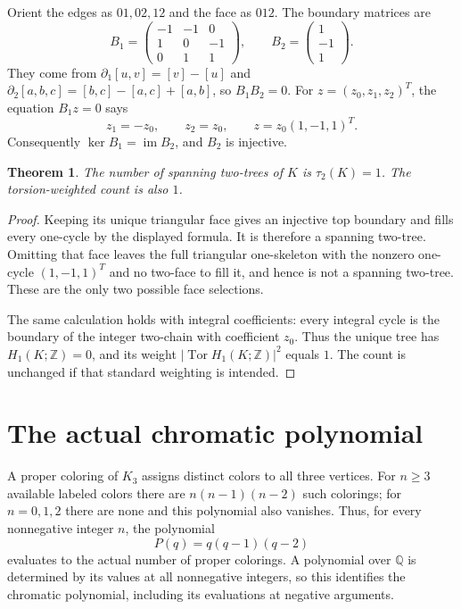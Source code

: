 \documentclass[11pt]{article}
\newtheorem{theorem}{Theorem}
\newcommand{\Q}{\mathbb Q}
\newcommand{\Z}{\mathbb Z}
\begin{document}
Orient the edges as $01,02,12$ and the face as $012$. The boundary matrices
are
\[
B_1=\begin{pmatrix}-1&-1&0\\1&0&-1\\0&1&1\end{pmatrix},
\qquad
B_2=\begin{pmatrix}1\\-1\\1\end{pmatrix}.
\]
They come from $\partial_1[u,v]=[v]-[u]$ and
$\partial_2[a,b,c]=[b,c]-[a,c]+[a,b]$, so $B_1B_2=0$.
For $z=(z_0,z_1,z_2)^T$, the equation $B_1z=0$ says
\[
z_1=-z_0,\qquad z_2=z_0,
\qquad z=z_0(1,-1,1)^T.
\]
Consequently $\ker B_1=\operatorname{im} B_2$, and $B_2$ is injective.

\begin{theorem}
The number of spanning two-trees of $K$ is $\tau_2(K)=1$.
The torsion-weighted count is also $1$.
\end{theorem}
\begin{proof}
Keeping its unique triangular face gives an injective top boundary and
fills every one-cycle by the displayed formula. It is therefore a
spanning two-tree. Omitting that face leaves the full triangular
one-skeleton with the nonzero one-cycle $(1,-1,1)^T$ and no two-face
to fill it, and hence is not a spanning two-tree. These are the only
two possible face selections.

The same calculation holds with integral coefficients: every integral
cycle is the boundary of the integer two-chain with coefficient $z_0$.
Thus the unique tree has $H_1(K;\Z)=0$, and its weight
$|\operatorname{Tor}H_1(K;\Z)|^2$ equals $1$.
The count is unchanged if that standard weighting is intended.
\end{proof}

\section*{The actual chromatic polynomial}
A proper coloring of $K_3$ assigns distinct colors to all three vertices.
For $n\geq3$ available labeled colors there are $n(n-1)(n-2)$ such
colorings; for $n=0,1,2$ there are none and this polynomial also vanishes.
Thus, for every nonnegative integer $n$, the polynomial
\[
P(q)=q(q-1)(q-2)
\]
evaluates to the actual number of proper colorings. A polynomial over
$\Q$ is determined by its values at all nonnegative integers, so this
identifies the chromatic polynomial, including its evaluations at
negative arguments.
\end{document}
